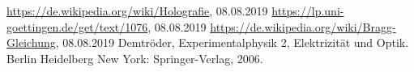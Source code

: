 \begin{thebibliography}{xxx}
		\url{https://de.wikipedia.org/wiki/Holografie},
		08.08.2019
		\url{https://lp.uni-goettingen.de/get/text/1076},
		08.08.2019
		\url{https://de.wikipedia.org/wiki/Bragg-Gleichung},
		08.08.2019
	 Demtröder, Experimentalphysik 2, Elektrizität und Optik. Berlin Heidelberg New York: Springer-Verlag, 2006.
\end{thebibliography}
 